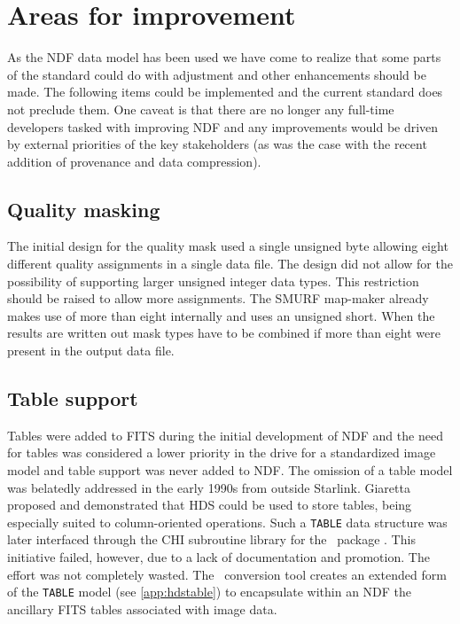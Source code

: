 \documentclass[final,authoryear,5p,times,twocolumn]{elsarticle}
\begin{document}
\section{Areas for improvement}

As the NDF data model has been used we have come to realize that some
parts of the standard could do with adjustment and other enhancements
should be made. The following items could be implemented and the
current standard does not preclude them. One caveat is that there are
no longer any full-time developers tasked with improving NDF and any
improvements would be driven by external priorities of the key
stakeholders (as was the case with the recent addition of provenance
and data compression).

\subsection{Quality masking}

The initial design for the quality mask used a single unsigned byte
allowing eight different quality assignments in a single data file. The
design did not allow for the possibility of supporting larger unsigned
integer data types. This restriction should be raised to allow more
assignments. The SMURF map-maker
\citep[][]{2013MNRAS.430.2545C} already makes use of more
than eight internally and uses an unsigned short. When the results are
written out mask types have to be combined if more than eight were present
in the output data file.

\subsection{Table support}

Tables were added to FITS \citep{1988A&AS...73..365H} during the
initial development of NDF and the need for tables was considered a
lower priority in the
drive for a standardized image model and table support was never added
to NDF.  The omission of a table model was belatedly addressed in the
early 1990s from outside Starlink.  Giaretta proposed and demonstrated
that HDS could be used to store tables, being especially suited to
column-oriented operations.  Such a \texttt{TABLE} data structure was
later interfaced through the CHI subroutine library \citep{SUN119} for
the \catpac\ package \citep{SUN120}.  This initiative failed, however,
due to a lack of documentation and promotion.  The effort was not
completely wasted.  The \fitstondf\ conversion tool \citep{SUN55}
creates an extended form of the \texttt{TABLE} model (see
\ref{app:hdstable}) to encapsulate within an NDF the ancillary FITS
tables associated with image data.
\end{document}
